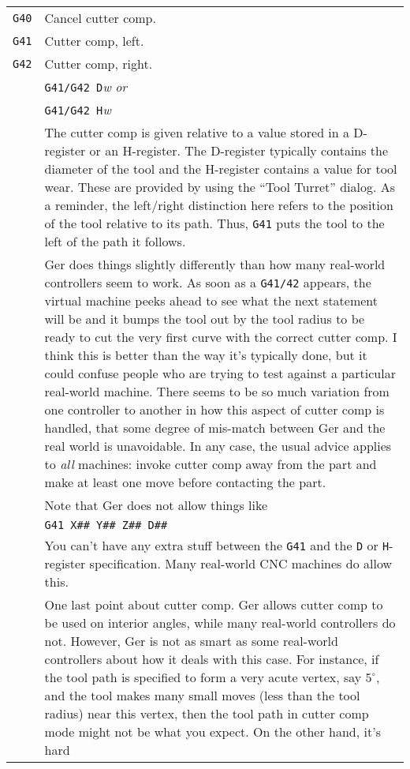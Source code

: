 \documentclass[titlepage,oneside,10pt]{article}
\begin{document}
\vskip 0.25cm
\begin{longtable}{lp{10cm}}
{\tt G40}&Cancel cutter comp.\\
{\tt G41}&Cutter comp, left.\\
{\tt G42}&Cutter comp, right. \\
&{\tt G41/G42 D}\emph{w} \emph{or}\\
&{\tt G41/G42 H}\emph{w} \\
& The cutter comp is given relative to a value stored in a
D-register or an H-register. The D-register typically contains the
diameter of the tool and the H-register contains a value for tool
wear. These are provided by using the ``Tool Turret'' dialog. As a
reminder, the left/right distinction here refers to the 
position of the tool relative to its path. Thus, {\tt G41} puts the
tool to the left of the path it follows.\\
&Ger does things slightly differently than how many real-world
controllers seem to work. As soon as a {\tt G41/42} appears, the
virtual machine peeks ahead to see what the next statement will be and
it bumps the tool out by the tool radius to be ready to cut the very
first curve with the correct cutter comp. I think this is better than the way
it's typically done, but it could confuse people who are trying to
test against a particular real-world machine. There seems to
be so much variation from one controller to another in how this aspect of
cutter comp is handled, that some degree of mis-match between Ger and
the real world is unavoidable. In any case, the usual advice applies
to \emph{all} machines: invoke cutter comp away from the part and make
at least one move before contacting the part. \\
& Note that Ger does not allow things like\\
& {\tt G41 X\#\# Y\#\# Z\#\# D\#\#}\\
& You can't have any extra stuff between the {\tt G41} and the {\tt D}
or {\tt H}-register specification. Many real-world CNC machines do
allow this.\\
& One last point about cutter comp. Ger allows cutter comp to be used
on interior angles, while many real-world controllers do not. However,
Ger is not as smart as some real-world controllers about how it deals
with this case. For instance, if the tool path is specified to form a
very acute vertex, say $5^\circ$, and the tool makes many small moves (less
than the tool radius) near this vertex, then the tool path in cutter
comp mode might not be what you expect. On the other hand, it's hard

\end{longtable}
\end{document}

